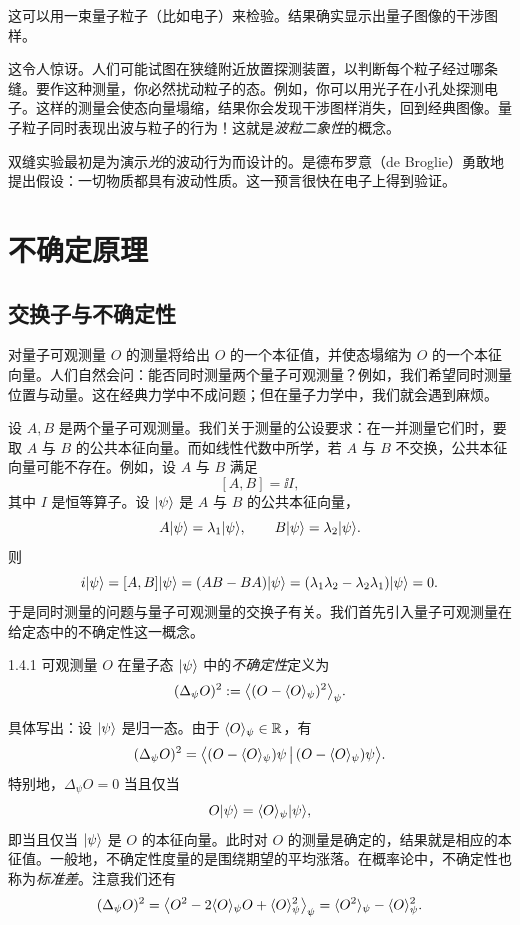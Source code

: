 
这可以用一束量子粒子（比如电子）来检验。结果确实显示出量子图像的干涉图样。

这令人惊讶。人们可能试图在狭缝附近放置探测装置，以判断每个粒子经过哪条缝。要作这种测量，你必然扰动粒子的态。例如，你可以用光子在小孔处探测电子。这样的测量会使态向量塌缩，结果你会发现干涉图样消失，回到经典图像。量子粒子同时表现出波与粒子的行为！这就是\emph{波粒二象性}的概念。

双缝实验最初是为演示\emph{光}的波动行为而设计的。是德布罗意（de Broglie）勇敢地提出假设：一切物质都具有波动性质。这一预言很快在电子上得到验证。


\section{不确定原理}

\subsection{交换子与不确定性}

对量子可观测量 $O$ 的测量将给出 $O$ 的一个本征值，并使态塌缩为 $O$ 的一个本征向量。人们自然会问：能否同时测量两个量子可观测量？例如，我们希望同时测量位置与动量。这在经典力学中不成问题；但在量子力学中，我们就会遇到麻烦。

设 $A,B$ 是两个量子可观测量。我们关于测量的公设要求：在一并测量它们时，要取 $A$ 与 $B$ 的公共本征向量。而如线性代数中所学，若 $A$ 与 $B$ 不交换，公共本征向量可能不存在。例如，设 $A$ 与 $B$ 满足
\[
[A,B]=\ii I,
\]
其中 $I$ 是恒等算子。设 $|\psi\rangle$ 是 $A$ 与 $B$ 的公共本征向量，
\[
A|\psi\rangle=\lambda_1|\psi\rangle,\qquad B|\psi\rangle=\lambda_2|\psi\rangle.
\]
则
\[
i|\psi\rangle=[A,B]|\psi\rangle=(AB-BA)|\psi\rangle
=(\lambda_1\lambda_2-\lambda_2\lambda_1)|\psi\rangle=0.
\]
于是同时测量的问题与量子可观测量的交换子有关。我们首先引入量子可观测量在给定态中的不确定性这一概念。

\begin{definition}{1.4.1}
  可观测量 $O$ 在量子态 $|\psi\rangle$ 中的\emph{不确定性}定义为
  \[
  (\Delta_{\psi}O)^2:=\bigl\langle (O-\langle O\rangle_{\psi})^2\bigr\rangle_{\psi}.
  \]
\end{definition}

具体写出：设 $|\psi\rangle$ 是归一态。由于 $\langle O\rangle_{\psi}\in\mathbb{R}$，有
\[
(\Delta_{\psi}O)^2
=\bigl\langle (O-\langle O\rangle_{\psi})\psi\,\big|\,(O-\langle O\rangle_{\psi})\psi\bigr\rangle.
\]
特别地，$\Delta_{\psi}O=0$ 当且仅当
\[
O|\psi\rangle=\langle O\rangle_{\psi}|\psi\rangle,
\]
即当且仅当 $|\psi\rangle$ 是 $O$ 的本征向量。此时对 $O$ 的测量是确定的，结果就是相应的本征值。一般地，不确定性度量的是围绕期望的平均涨落。在概率论中，不确定性也称为\emph{标准差}。注意我们还有
\[
(\Delta_{\psi}O)^2
=\bigl\langle O^2-2\langle O\rangle_{\psi}O+\langle O\rangle_{\psi}^2\bigr\rangle_{\psi}
=\langle O^2\rangle_{\psi}-\langle O\rangle_{\psi}^2.
\]

